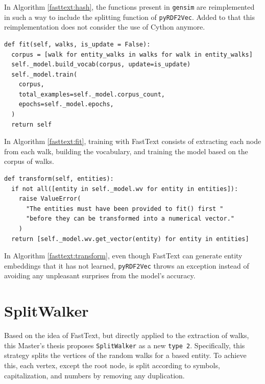 In Algorithm \ref{fasttext:hash}, the functions present in \texttt{gensim} are
reimplemented in such a way to include the splitting function of
\texttt{pyRDF2Vec}. Added to that this reimplementation does not consider the
use of Cython anymore.

\begin{lstlisting}[caption=Fitting the FastText Model According to the Provided Walks.,label=fasttext:fit]
def fit(self, walks, is_update = False):
  corpus = [walk for entity_walks in walks for walk in entity_walks]
  self._model.build_vocab(corpus, update=is_update)
  self._model.train(
    corpus,
    total_examples=self._model.corpus_count,
    epochs=self._model.epochs,
  )
  return self
\end{lstlisting}

In Algorithm \ref{fasttext:fit}, training with FastText consists of extracting
each node from each walk, building the vocabulary, and training the model based
on the corpus of walks.

\begin{lstlisting}[caption=Getting the Entity Embeddings with FastText.,label=fasttext:transform]
def transform(self, entities):
  if not all([entity in self._model.wv for entity in entities]):
    raise ValueError(
      "The entities must have been provided to fit() first "
      "before they can be transformed into a numerical vector."
    )
  return [self._model.wv.get_vector(entity) for entity in entities]
\end{lstlisting}

In Algorithm \ref{fasttext:transform}, even though FastText can generate entity
embeddings that it has not learned, \texttt{pyRDF2Vec} throws an exception
instead of avoiding any unpleasant surprises from the model’s accuracy.

\section{SplitWalker}
\label{sec:split:walker}

Based on the idea of FastText, but directly applied to the extraction of walks,
this Master's thesis proposes \texttt{SplitWalker} as a new \texttt{type
2}. Specifically, this strategy splits the vertices of the random walks for a
based entity. To achieve this, each vertex, except the root node, is split
according to symbols, capitalization, and numbers by removing any duplication.

